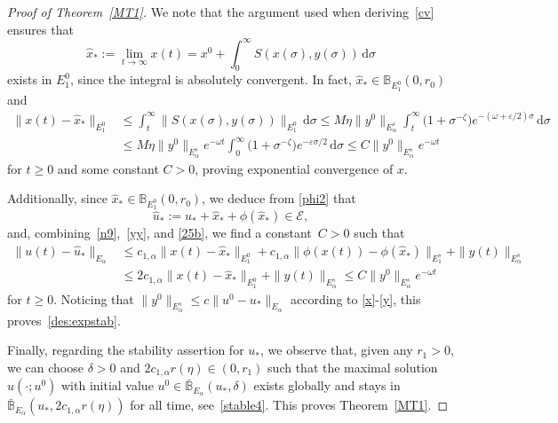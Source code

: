 \documentclass[reqno,11pt]{amsart}
\numberwithin{equation}{section}
\newcommand{\ve}{\varepsilon}
\newcommand{\rd}{\mathrm{d}}
\theoremstyle{remark}
\begin{document}
\begin{proof}[Proof of Theorem~\ref{MT1}]
We note that the argument used when deriving~\eqref{cv} ensures that
\begin{equation}\label{xstar}
\hat x_*:=\lim_{t\to\infty} x(t)=x^0+\int_0^\infty S(x(\sigma),y(\sigma))\,\rd\sigma
\end{equation}
exists in $E_1^0$, since the integral is absolutely convergent. In fact, $\hat x_*\in \mathbb{B}_{E_1^0}(0,r_0)$ and
\begin{equation}\label{25b}
\begin{aligned}
\|x(t)-\hat x_*\|_{E_1^0}&\le \int_t^\infty \|S(x(\sigma),y(\sigma))\|_{E_1^0}\,\rd \sigma 
\leq  M\eta \| y^0\|_{E_\alpha^s} \int_ t^\infty \big(1+\sigma^{-\zeta}\big)e^{-(\omega  +\ve/2)\sigma} \,\rd \sigma\\
&\le M\eta \| y^0\|_{E_\alpha^s}e^{-\omega t} \int_ 0^\infty \big( 1+\sigma^{-\zeta}\big)e^{- \ve\sigma/2} \,\rd \sigma\leq C\| y^0\|_{E_\alpha^s} e^{-\omega t} 
\end{aligned}
\end{equation}
 for $t\ge 0$ and some constant $C>0$,   proving exponential convergence of $x$. 

Additionally, since $\hat x_*\in \mathbb{B}_{E_1^0}(0,r_0)$, we deduce from \eqref{phi2} that
\begin{equation}\label{ustar}
\hat u_*:=u_*+\hat x_*+\phi(\hat x_*)\in \mathcal{E},
\end{equation}
and,  combining~\eqref{n9},~\eqref{yy}, and \eqref{25b}, we find a constant~${C>0}$ such that
\begin{align*}
\|u(t)-\hat u_*\|_{E_\alpha}&\le c_{1,\alpha}\|x(t) -\hat x_*\|_{E_1^0} +c_{1,\alpha}\|\phi(x(t))-\phi(\hat x_*)\|_{E_1^s}+\| y(t)\|_{E_\alpha^s}\\
&\le 2c_{1,\alpha}\|x(t) -\hat x_*\|_{E_1^0}+\| y(t)\|_{E_\alpha^s}\le C\| y^0\|_{E_\alpha^s} e^{-\omega t}
\end{align*}
 for $t\geq 0$.
Noticing that $\| y^0\|_{E_\alpha^s} \le c\|u^0-u_*\|_{E_\alpha}$
according to \eqref{x}-\eqref{y}, this proves~\eqref{des:expstab}.\medskip

Finally, regarding the stability assertion for $u_*$, we observe that, given any $r_1>0$, 
we can choose $\delta>0$ and $2 c_{1,\alpha}r(\eta)\in (0,r_1)$ such that the maximal solution $u(\cdot;u^0)$ with initial value  $u^0\in \bar{\mathbb{B}}_{E_\alpha}(u_*,\delta)$ exists globally and stays in $\bar{\mathbb{B}}_{E_\alpha}(u_*, 2 c_{1,\alpha}r(\eta))$ for all time, see~\eqref{stable4}. This proves Theorem~\ref{MT1}.
\end{proof}
\end{document}
